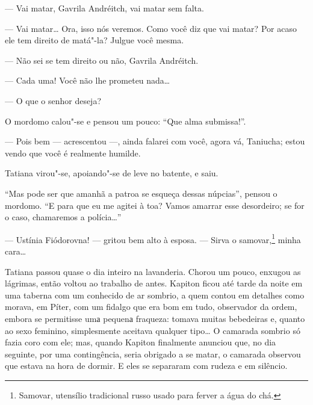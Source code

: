 --- Vai matar, Gavrila Andréitch, vai matar sem falta.

--- Vai matar\ldots{} Ora, isso nós veremos. Como você diz que vai matar? Por
acaso ele tem direito de matá"-la? Julgue você mesma.

--- Não sei se tem direito ou não, Gavrila Andréitch.

--- Cada uma! Você não lhe prometeu nada\ldots{}

--- O que o senhor deseja?

O mordomo calou"-se e pensou um pouco: ``Que alma submissa!''.

--- Pois bem --- acrescentou ---, ainda falarei com você, agora vá,
Taniucha; estou vendo que você é realmente humilde.

Tatiana virou"-se, apoiando"-se de leve no batente, e saiu.

``Mas pode ser que amanhã a patroa se esqueça dessas núpcias'', pensou o
mordomo. ``E para que eu me agitei à toa? Vamos amarrar esse desordeiro;
se for o caso, chamaremos a polícia\ldots{}''

--- Ustínia Fiódorovna! --- gritou bem alto à esposa. --- Sirva o
samovar,\footnote{Samovar, utensílio tradicional russo usado para
  ferver a água do chá.} minha cara\ldots{}

Tatiana passou quase o dia inteiro na lavanderia. Chorou um pouco,
enxugou as lágrimas, então voltou ao trabalho de antes. Kapiton ficou
até tarde da noite em uma taberna com um conhecido de ar sombrio, a quem
contou em detalhes como morava, em Píter, com um fidalgo que era bom em
tudo, observador da ordem, embora se permitisse umа pequenа fraqueza:
tomava muitas bebedeiras e, quanto ao sexo feminino, simplesmente
aceitava qualquer tipo\ldots{} O camarada sombrio só fazia coro com ele; mas,
quando Kapiton finalmente anunciou que, no dia seguinte, por uma
contingência, seria obrigado a se matar, o camarada observou que estava
na hora de dormir. E eles se separaram com rudeza e em silêncio.

